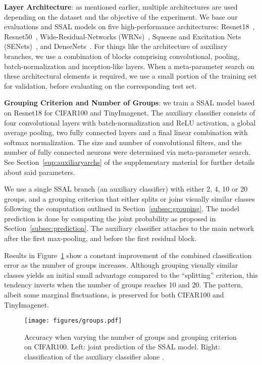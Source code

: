 \documentclass[10pt,twocolumn,letterpaper]{article}
\begin{document}
\textbf{Layer Architecture}: as mentioned earlier, multiple architectures are used depending on the dataset and the objective of the experiment.
We base our evaluations and SSAL models on five high-performance architectures: Resnet18~\cite{he2016deep}, Resnet50~\cite{he2016deep}, Wide-Residual-Networks (WRNs)~\cite{zagoruyko2016wide}, Squeeze and Excitation Nets (SENets)~\cite{hu2018squeeze}, and DenseNets~\cite{huang2017densely}.
For things like the architecture of auxiliary branches, we use a combination of blocks comprising convolutional, pooling, batch-normalization and inception-like layers.
When a meta-parameter search on these architectural elements is required, we use a small portion of the training set for validation, before evaluating on the corresponding test set.

\textbf{Grouping Criterion and Number of Groups}: we train a SSAL model based on Resnet18 for CIFAR100 and TinyImagenet.
The auxiliary classifier consists of four convolutional layers with batch-normalization and ReLU activation, a global average pooling, two fully connected layers and a final linear combination with softmax normalization.
The size and number of convolutional filters, and the number of fully connected neurons were determined via meta-parameter search.
See Section~\ref{sup:auxiliaryarchs} of the supplementary material for further details about said parameters.

We use a single SSAL branch (\ie an auxiliary classifier) with either 2, 4, 10 or 20 groups, and a grouping criterion that either splits or joins visually similar classes following the computation outlined in Section~\ref{subsec:grouping}.
The model prediction is done by computing the joint probability as proposed in Section~\ref{subsec:prediction}.
The auxiliary classifier attaches to the main network after the first max-pooling, and before the first residual block.

Results in Figure~\ref{fig:cifar100resnet10groups} show a constant improvement of the combined classification error as the number of groups increases.
Although grouping visually similar classes yields an initial small advantage compared to the ``splitting'' criterion, this tendency inverts when the number of groups reaches 10 and 20.
The pattern, albeit some marginal fluctuations, is preserved for both CIFAR100 and TinyImagenet.

\begin{figure}[t]
\centering
    \texttt{[image: figures/groups.pdf]}
	\caption{Accuracy when varying the number of groups and grouping criterion on CIFAR100. Left: joint prediction of the SSAL model. Right: classification of the auxiliary classifier alone  .}
	\label{fig:cifar100resnet10groups}
\end{figure}
\end{document}
